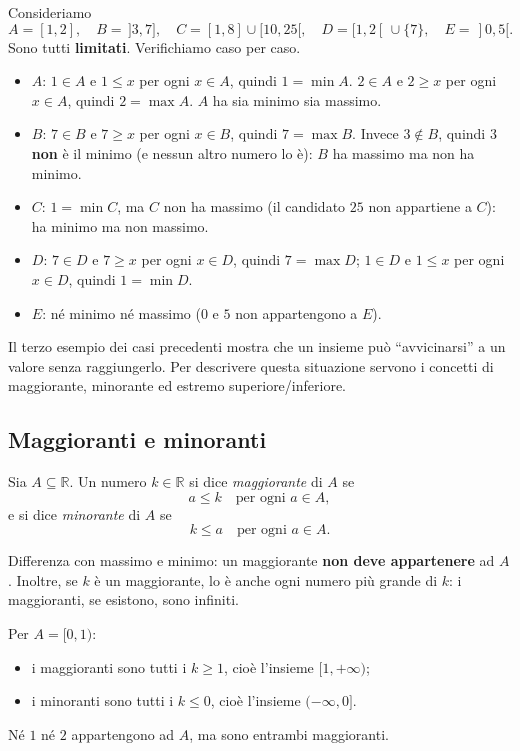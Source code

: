\documentclass[11pt,a4paper]{article}
\begin{document}
\begin{esempio}
Consideriamo
\[
A = [1, 2], \quad B = \,]3, 7], \quad C = [1, 8] \cup [10, 25[, \quad
D = [1, 2[ \,\cup \{7\}, \quad E = \,]0, 5[.
\]
Sono tutti \textbf{limitati}. Verifichiamo caso per caso.
\begin{itemize}
    \item $A$: $1 \in A$ e $1 \leq x$ per ogni $x \in A$, quindi $1 = \min A$.
          $2 \in A$ e $2 \geq x$ per ogni $x \in A$, quindi $2 = \max A$.
          $A$ ha sia minimo sia massimo.
    \item $B$: $7 \in B$ e $7 \geq x$ per ogni $x \in B$, quindi $7 = \max B$.
          Invece $3 \notin B$, quindi $3$ \textbf{non} è il minimo (e nessun altro
          numero lo è): $B$ ha massimo ma non ha minimo.
    \item $C$: $1 = \min C$, ma $C$ non ha massimo (il candidato $25$ non
          appartiene a $C$): ha minimo ma non massimo.
    \item $D$: $7 \in D$ e $7 \geq x$ per ogni $x \in D$, quindi $7 = \max D$;
          $1 \in D$ e $1 \leq x$ per ogni $x \in D$, quindi $1 = \min D$.
    \item $E$: né minimo né massimo ($0$ e $5$ non appartengono a $E$).
\end{itemize}
\end{esempio}

Il terzo esempio dei casi precedenti mostra che un insieme può ``avvicinarsi'' a un valore senza
raggiungerlo. Per descrivere questa situazione servono i concetti di
maggiorante, minorante ed estremo superiore/inferiore.

\subsection{Maggioranti e minoranti}

\begin{definizione}
Sia $A \subseteq \mathbb{R}$. Un numero $k \in \mathbb{R}$ si dice
\emph{maggiorante} di $A$ se
\[
a \leq k \quad \text{per ogni } a \in A,
\]
e si dice \emph{minorante} di $A$ se
\[
k \leq a \quad \text{per ogni } a \in A.
\]
\end{definizione}

Differenza con massimo e minimo: un maggiorante \textbf{non deve
appartenere} ad $A$. Inoltre, se $k$ è un maggiorante, lo è anche ogni
numero più grande di $k$: i maggioranti, se esistono, sono infiniti.

\begin{esempio}
Per $A = [0, 1)$:
\begin{itemize}
    \item i maggioranti sono tutti i $k \geq 1$, cioè l'insieme $[1, +\infty)$;
    \item i minoranti sono tutti i $k \leq 0$, cioè l'insieme $(-\infty, 0]$.
\end{itemize}
Né $1$ né $2$ appartengono ad $A$, ma sono entrambi maggioranti.
\end{esempio}
\end{document}
